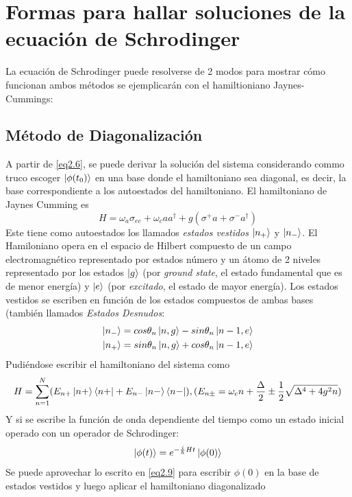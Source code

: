 \documentclass{book}
\begin{document}
\section{Formas para hallar soluciones de la ecuación de Schrodinger}
La ecuación de Schrodinger puede resolverse de 2 modos para mostrar cómo funcionan ambos métodos se ejemplicarán con el hamiltioniano Jaynes-Cummings:
\subsection{Método de Diagonalización}
A partir de \ref{eq2.6}, se puede derivar la solución del sistema considerando commo truco escoger $\ket{\phi(t_0)}$ en una base donde el hamiltoniano sea diagonal, es decir, la base correspondiente a los autoestados del  hamiltoniano. El hamiltoniano de Jaynes Cumming es
\begin{equation}\label{eq2.22} H=\omega_a\sigma_{ee}+\omega_c aa^\dag +g(\sigma^+a+\sigma^-a^\dag)\end{equation}
Este tiene como autoestados los llamados \textit{estados vestidos} $\ket{n_+}$ y $\ket{n_-}$. El Hamiloniano opera en el espacio de Hilbert compuesto de un campo electromagnético representado por estados número y un átomo de 2 niveles representado por los estados $\ket{g}$ (por \textit{ground state}, el estado fundamental que es de menor energía) y $\ket{e}$ (por \textit{excitado}, el estado de mayor energía). Los estados vestidos se escriben en función de los estados compuestos de ambas bases (también llamados \textit{Estados Desnudos}:
\begin{equation}\label{eq2.23}\begin{aligned} \ket{n_-}=cos \theta_n\ket{n,g}-sin \theta_n\ket{n-1,e}\\\ket{n_+}=sin \theta_n\ket{n,g}+cos\theta_n\ket{n-1,e} \end{aligned}\end{equation}
Pudiéndose escribir el hamiltoniano del sistema como
\begin{equation}\label{eq2.24}H=\sum_{n=1}^N(E_{n+}\ket{n+}\bra{n+}+E_{n-}\ket{n-}\bra{n-}), (E_{n\pm}=\omega_c n+\frac{\Delta}{2}\pm\frac{1}{2}\sqrt{\Delta^4+4g^2n})\end{equation}
Y si se escribe la función de onda dependiente del tiempo como un estado inicial operado con un operador de Schrodinger:
\begin{equation}\label{eq2.25}\ket{\phi(t)}=e^{-\frac{i}{\hslash} Ht}\ket{\phi(0)}\end{equation}
Se puede aprovechar lo escrito en \ref{eq2.9} para escribir $\phi(0)$ en la base de estados vestidos y luego aplicar el hamiltoniano diagonalizado
\end{document}
